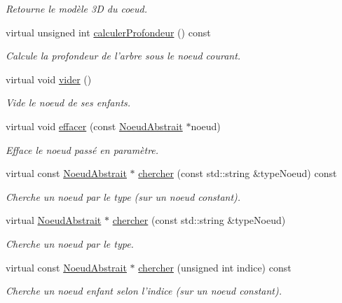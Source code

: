\begin{DoxyCompactItemize}
\begin{DoxyCompactList}\small\item\em Retourne le modèle 3\-D du coeud. \end{DoxyCompactList}\item 
virtual unsigned int \hyperlink{group__inf2990_gad854800087fd6c13f1a63589caefb41d}{calculer\-Profondeur} () const 
\begin{DoxyCompactList}\small\item\em Calcule la profondeur de l'arbre sous le noeud courant. \end{DoxyCompactList}\item 
virtual void \hyperlink{group__inf2990_ga55435ee83860c6a2101334ba67bbd9b6}{vider} ()
\begin{DoxyCompactList}\small\item\em Vide le noeud de ses enfants. \end{DoxyCompactList}\item 
virtual void \hyperlink{group__inf2990_ga2ab3dc520026d1ad77aa848981688bfd}{effacer} (const \hyperlink{class_noeud_abstrait}{Noeud\-Abstrait} $\ast$noeud)
\begin{DoxyCompactList}\small\item\em Efface le noeud passé en paramètre. \end{DoxyCompactList}\item 
virtual const \hyperlink{class_noeud_abstrait}{Noeud\-Abstrait} $\ast$ \hyperlink{group__inf2990_gaeda0df98faf404765d985fcde60fb924}{chercher} (const std\-::string \&type\-Noeud) const 
\begin{DoxyCompactList}\small\item\em Cherche un noeud par le type (sur un noeud constant). \end{DoxyCompactList}\item 
virtual \hyperlink{class_noeud_abstrait}{Noeud\-Abstrait} $\ast$ \hyperlink{group__inf2990_ga0868ae108165b071f6c8a68a7265c770}{chercher} (const std\-::string \&type\-Noeud)
\begin{DoxyCompactList}\small\item\em Cherche un noeud par le type. \end{DoxyCompactList}\item 
virtual const \hyperlink{class_noeud_abstrait}{Noeud\-Abstrait} $\ast$ \hyperlink{group__inf2990_gac334b078c318e39a065b85572778bf13}{chercher} (unsigned int indice) const 
\begin{DoxyCompactList}\small\item\em Cherche un noeud enfant selon l'indice (sur un noeud constant). \end{DoxyCompactList}\item 

\end{DoxyCompactItemize}
